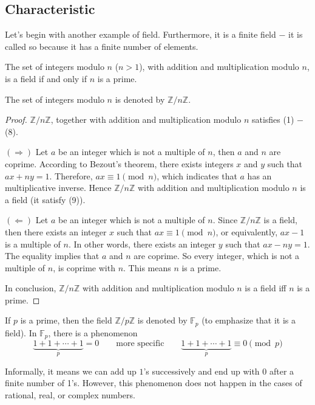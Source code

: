\subsection{Characteristic}

Let's begin with another example of field. Furthermore, it is a finite field $-$ it is called so because it has a finite number of elements.

\begin{theorem}
    The set of integers modulo $n$ ($n > 1$), with addition and multiplication modulo $n$, is a field if and only if $n$ is a prime.
\end{theorem}

The set of integers modulo $n$ is denoted by $\mathbb{Z}/n\mathbb{Z}$.

\begin{proof}
    $\mathbb{Z}/n\mathbb{Z}$, together with addition and multiplication modulo $n$ satisfies (1) $-$ (8).

    $(\Rightarrow)$ Let $a$ be an integer which is not a multiple of $n$, then $a$ and $n$ are coprime. According to Bezout's theorem, there exists integers $x$ and $y$ such that $ax + ny = 1$. Therefore, $ax\equiv 1\pmod{n}$, which indicates that $a$ has an multiplicative inverse. Hence $\mathbb{Z}/n\mathbb{Z}$ with addition and multiplication modulo $n$ is a field (it satisfy (9)).

    $(\Leftarrow)$ Let $a$ be an integer which is not a multiple of $n$. Since $\mathbb{Z}/n\mathbb{Z}$ is a field, then there exists an integer $x$ such that $ax\equiv 1\pmod{n}$, or equivalently, $ax - 1$ is a multiple of $n$. In other words, there exists an integer $y$ such that $ax - ny = 1$. The equality implies that $a$ and $n$ are coprime. So every integer, which is not a multiple of $n$, is coprime with $n$. This means $n$ is a prime.

    In conclusion, $\mathbb{Z}/n\mathbb{Z}$ with addition and multiplication modulo $n$ is a field iff $n$ is a prime.
\end{proof}

If $p$ is a prime, then the field $\mathbb{Z}/p\mathbb{Z}$ is denoted by $\mathbb{F}_{p}$ (to emphasize that it is a field). In $\mathbb{F}_{p}$, there is a phenomenon
\[
    \underbrace{1 + 1 + \cdots + 1}_{p} = 0 \qquad \text{more specific}\qquad \underbrace{1 + 1 + \cdots + 1}_{p} \equiv 0\pmod{p}
\]

Informally, it means we can add up $1$'s successively and end up with $0$ after a finite number of 1's. However, this phenomenon does not happen in the cases of rational, real, or complex numbers.

